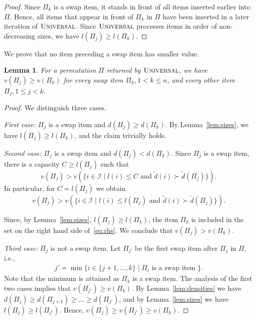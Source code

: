\documentclass[11pt]{article}
\newtheorem{lemma}[theorem]{Lemma}
\newcommand{\I}{\mathcal{I}}
\newcommand{\innerand}{\text{ and }}
\begin{document}
\begin{proof}
Since $\Pi_{k}$ is a swap item, it stands in front of all items inserted
earlier into $\Pi$. Hence, all items that appear in front of $\Pi_{k}$
in $\Pi$ have been inserted in a later iteration of $\textsc{Universal}$.
Since $\textsc{Universal}$ processes items in order of non-decreasing
sizes, we have $l(\Pi_{j})\geq l(\Pi_{k})$.  
\end{proof}
We prove that no item preceding a swap item has smaller value.
\begin{lemma}
For a permutation $\Pi$ returned by $\textsc{Universal}$, we have
$v(\Pi_{j})\geq v(\Pi_{k})$ for every swap item $\Pi_{k},1<k\leq n$,
and every other item $\Pi_{j},1\leq j<k$. \label{lem:values} \end{lemma}
\begin{proof}
We distinguish three cases.

\emph{First case:} $\Pi_{j}$ is a swap item and $d(\Pi_{j})\geq d(\Pi_{k})$.
By Lemma~\ref{lem:sizes}, we have $l(\Pi_{j})\geq l(\Pi_{k})$,
and the claim trivially holds.

\emph{Second case:} $\Pi_{j}$ is a swap item and $d(\Pi_{j})<d(\Pi_{k})$.
Since $\Pi_{j}$ is a swap item, there is a capacity $C\geq l(\Pi_{j})$
such that
\[
v(\Pi_{j})>v(\{i\in\I\mid l(i)\leq C\innerand\tilde{d}(i)\succ\tilde{d}(\Pi_{j})\}).
\]
In particular, for $C=l(\Pi_{j})$ we obtain
\begin{equation}
v(\Pi_{j})>v(\{i\in\mathcal{I}\mid l(i)\leq l(\Pi_{j})\innerand\tilde{d}(i)\succ\tilde{d}(\Pi_{j})\}).\label{eq:rhs}
\end{equation}


Since, by Lemma~\ref{lem:sizes}, $l(\Pi_{j})\geq l(\Pi_{k})$, the
item $\Pi_{k}$ is included in the set on the right hand side of~\eqref{eq:rhs}.
We conclude that $v(\Pi_{j})>v(\Pi_{k})$.

\emph{Third case:} $\Pi_{j}$ is not a swap item. Let $\Pi_{j'}$
be the first swap item after $\Pi_{j}$ in $\Pi$, i.e., 
\begin{align*}
j'=\min\{i\in\{j+1,\dots,k\}\mid\Pi_{i}\text{ is a swap item }\}.
\end{align*}
Note that the minimum is attained as $\Pi_{k}$ is a swap item. The
analysis of the first two cases implies that $v(\Pi_{j'})\geq v(\Pi_{k})$.
By Lemma~\ref{lem:densities} we have $d(\Pi_{j})\geq d(\Pi_{j+1})\geq\dots\geq d(\Pi_{j'})$,
and by Lemma~\ref{lem:sizes} we have $l(\Pi_{j})\geq l(\Pi_{j'})$.
Hence, $v(\Pi_{j})\geq v(\Pi_{j'})\geq v(\Pi_{k})$.  
\end{proof}
\end{document}
